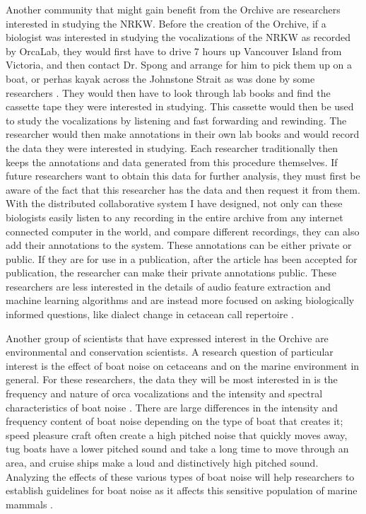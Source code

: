 \documentclass[12pt,oneside]{book}
\begin{document}
Another community that might gain benefit from the Orchive are
researchers interested in studying the NRKW.  Before the creation of the Orchive, if a biologist was
interested in studying the vocalizations of the NRKW as recorded by
OrcaLab, they would first have to drive 7 hours up Vancouver Island
from Victoria, and then contact Dr. Spong and arrange for him to pick
them up on a boat, or perhas kayak across the Johnstone Strait as was
done by some researchers \cite{deecke1999quantifying}. They would then
have to look through lab books and find the cassette tape they were
interested in studying.  This cassette would then be used to study the
vocalizations by listening and fast forwarding and rewinding.  The
researcher would then make annotations in their own lab books and
would record the data they were interested in studying.  Each
researcher traditionally then keeps the annotations and data generated
from this procedure themselves.  If future researchers want to obtain
this data for further analysis, they must first be aware of the fact
that this researcher has the data and then request it from them.  With
the distributed collaborative system I have designed, not only can
these biologists easily listen to any recording in the entire archive
from any internet connected computer in the world, and compare
different recordings, they can also add their annotations to the
system.  These annotations can be either private or public.  If they
are for use in a publication, after the article has been accepted for
publication, the researcher can make their private annotations public.
These researchers are less interested in the details of audio feature
extraction and machine learning algorithms and are instead more
focused on asking biologically informed questions, like dialect change
in cetacean call repertoire \cite{deecke2000dialect}.

Another group of scientists that have expressed interest in the
Orchive are environmental and conservation scientists. A research
question of particular interest is the effect of boat noise
\cite{foote2004noise} on cetaceans and on the marine environment in
general.  For these researchers, the data they will be most interested
in is the frequency and nature of orca vocalizations and the intensity
and spectral characteristics of boat noise \cite{holt2009speakingup}.
There are large differences in the intensity and frequency content of
boat noise depending on the type of boat that creates it; speed
pleasure craft often create a high pitched noise that quickly moves
away, tug boats have a lower pitched sound and take a long time to
move through an area, and cruise ships make a loud and distinctively
high pitched sound.  Analyzing the effects of these various types of
boat noise will help researchers to establish guidelines for boat
noise as it affects this sensitive population of marine mammals
\cite{doksaeter2009orca}.
\end{document}

